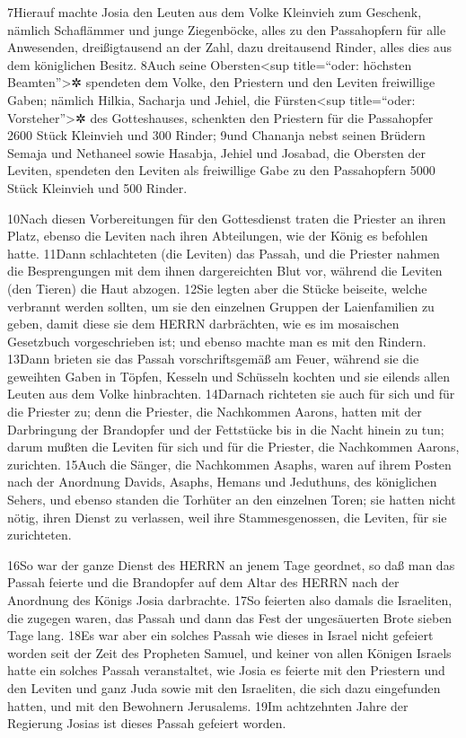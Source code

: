 7Hierauf machte Josia den Leuten aus dem Volke Kleinvieh zum Geschenk,
nämlich Schaflämmer und junge Ziegenböcke, alles zu den Passahopfern für
alle Anwesenden, dreißigtausend an der Zahl, dazu dreitausend Rinder,
alles dies aus dem königlichen Besitz. 8Auch seine Obersten\textless sup
title=``oder: höchsten Beamten''\textgreater✲ spendeten dem Volke, den
Priestern und den Leviten freiwillige Gaben; nämlich Hilkia, Sacharja
und Jehiel, die Fürsten\textless sup title=``oder:
Vorsteher''\textgreater✲ des Gotteshauses, schenkten den Priestern für
die Passahopfer 2600 Stück Kleinvieh und 300 Rinder; 9und Chananja nebst
seinen Brüdern Semaja und Nethaneel sowie Hasabja, Jehiel und Josabad,
die Obersten der Leviten, spendeten den Leviten als freiwillige Gabe zu
den Passahopfern 5000 Stück Kleinvieh und 500 Rinder.

10Nach diesen Vorbereitungen für den Gottesdienst traten die Priester an
ihren Platz, ebenso die Leviten nach ihren Abteilungen, wie der König es
befohlen hatte. 11Dann schlachteten (die Leviten) das Passah, und die
Priester nahmen die Besprengungen mit dem ihnen dargereichten Blut vor,
während die Leviten (den Tieren) die Haut abzogen. 12Sie legten aber die
Stücke beiseite, welche verbrannt werden sollten, um sie den einzelnen
Gruppen der Laienfamilien zu geben, damit diese sie dem HERRN
darbrächten, wie es im mosaischen Gesetzbuch vorgeschrieben ist; und
ebenso machte man es mit den Rindern. 13Dann brieten sie das Passah
vorschriftsgemäß am Feuer, während sie die geweihten Gaben in Töpfen,
Kesseln und Schüsseln kochten und sie eilends allen Leuten aus dem Volke
hinbrachten. 14Darnach richteten sie auch für sich und für die Priester
zu; denn die Priester, die Nachkommen Aarons, hatten mit der Darbringung
der Brandopfer und der Fettstücke bis in die Nacht hinein zu tun; darum
mußten die Leviten für sich und für die Priester, die Nachkommen Aarons,
zurichten. 15Auch die Sänger, die Nachkommen Asaphs, waren auf ihrem
Posten nach der Anordnung Davids, Asaphs, Hemans und Jeduthuns, des
königlichen Sehers, und ebenso standen die Torhüter an den einzelnen
Toren; sie hatten nicht nötig, ihren Dienst zu verlassen, weil ihre
Stammesgenossen, die Leviten, für sie zurichteten.

16So war der ganze Dienst des HERRN an jenem Tage geordnet, so daß man
das Passah feierte und die Brandopfer auf dem Altar des HERRN nach der
Anordnung des Königs Josia darbrachte. 17So feierten also damals die
Israeliten, die zugegen waren, das Passah und dann das Fest der
ungesäuerten Brote sieben Tage lang. 18Es war aber ein solches Passah
wie dieses in Israel nicht gefeiert worden seit der Zeit des Propheten
Samuel, und keiner von allen Königen Israels hatte ein solches Passah
veranstaltet, wie Josia es feierte mit den Priestern und den Leviten und
ganz Juda sowie mit den Israeliten, die sich dazu eingefunden hatten,
und mit den Bewohnern Jerusalems. 19Im achtzehnten Jahre der Regierung
Josias ist dieses Passah gefeiert worden.

